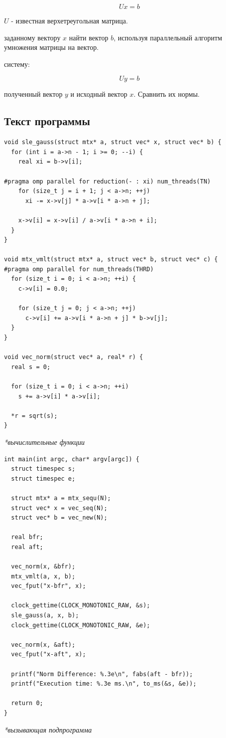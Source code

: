 \documentclass[12pt, a4paper]{article}
\begin{document}
$$ Ux = b $$

 $U$ - известная верхетреугольная матрица.
\vspace{2mm}
\par{} заданному вектору $x$ найти вектор $b$, используя
параллельный алгоритм умножения матрицы на вектор.
\vspace{2mm}
\par{} систему:

$$ Uy = b $$

 полученный вектор $y$ и исходный вектор $x$. 
Сравнить их нормы.

\subsection{Текст программы}
\begin{verbatim}
void sle_gauss(struct mtx* a, struct vec* x, struct vec* b) {
  for (int i = a->n - 1; i >= 0; --i) {
    real xi = b->v[i];

#pragma omp parallel for reduction(- : xi) num_threads(TN)
    for (size_t j = i + 1; j < a->n; ++j)
      xi -= x->v[j] * a->v[i * a->n + j];

    x->v[i] = x->v[i] / a->v[i * a->n + i];
  }
}

void mtx_vmlt(struct mtx* a, struct vec* b, struct vec* c) {
#pragma omp parallel for num_threads(THRD)
  for (size_t i = 0; i < a->n; ++i) {
    c->v[i] = 0.0;

    for (size_t j = 0; j < a->n; ++j)
      c->v[i] += a->v[i * a->n + j] * b->v[j];
  }
}

void vec_norm(struct vec* a, real* r) {
  real s = 0;

  for (size_t i = 0; i < a->n; ++i)
    s += a->v[i] * a->v[i];

  *r = sqrt(s);
}
\end{verbatim}
\textit{*вычислительные функции}

\begin{verbatim}
int main(int argc, char* argv[argc]) {
  struct timespec s;
  struct timespec e;

  struct mtx* a = mtx_sequ(N);
  struct vec* x = vec_seq(N);
  struct vec* b = vec_new(N);

  real bfr;
  real aft;

  vec_norm(x, &bfr);
  mtx_vmlt(a, x, b);
  vec_fput("x-bfr", x);

  clock_gettime(CLOCK_MONOTONIC_RAW, &s);
  sle_gauss(a, x, b);
  clock_gettime(CLOCK_MONOTONIC_RAW, &e);

  vec_norm(x, &aft);
  vec_fput("x-aft", x);

  printf("Norm Difference: %.3e\n", fabs(aft - bfr));
  printf("Execution time: %.3e ms.\n", to_ms(&s, &e));

  return 0;
}
\end{verbatim}
\textit{*вызывающая подпрограмма}
\end{document}
